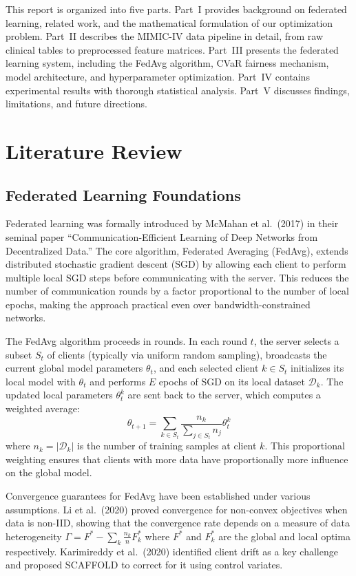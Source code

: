 \documentclass[11pt,a4paper]{report}
\begin{document}
This report is organized into five parts. Part~I provides background on federated learning, related work, and the mathematical formulation of our optimization problem. Part~II describes the MIMIC-IV data pipeline in detail, from raw clinical tables to preprocessed feature matrices. Part~III presents the federated learning system, including the FedAvg algorithm, CVaR fairness mechanism, model architecture, and hyperparameter optimization. Part~IV contains experimental results with thorough statistical analysis. Part~V discusses findings, limitations, and future directions.


\chapter{Literature Review}

\section{Federated Learning Foundations}

Federated learning was formally introduced by McMahan et al.\ (2017) in their seminal paper ``Communication-Efficient Learning of Deep Networks from Decentralized Data.'' The core algorithm, Federated Averaging (FedAvg), extends distributed stochastic gradient descent (SGD) by allowing each client to perform multiple local SGD steps before communicating with the server. This reduces the number of communication rounds by a factor proportional to the number of local epochs, making the approach practical even over bandwidth-constrained networks.

The FedAvg algorithm proceeds in rounds. In each round $t$, the server selects a subset $S_t$ of clients (typically via uniform random sampling), broadcasts the current global model parameters $\theta_t$, and each selected client $k \in S_t$ initializes its local model with $\theta_t$ and performs $E$ epochs of SGD on its local dataset $\mathcal{D}_k$. The updated local parameters $\theta_t^k$ are sent back to the server, which computes a weighted average:
\begin{equation}
\theta_{t+1} = \sum_{k \in S_t} \frac{n_k}{\sum_{j \in S_t} n_j} \theta_t^k
\label{eq:fedavg}
\end{equation}
where $n_k = |\mathcal{D}_k|$ is the number of training samples at client $k$. This proportional weighting ensures that clients with more data have proportionally more influence on the global model.

Convergence guarantees for FedAvg have been established under various assumptions. Li et al.\ (2020) proved convergence for non-convex objectives when data is non-IID, showing that the convergence rate depends on a measure of data heterogeneity $\Gamma = F^* - \sum_k \frac{n_k}{n} F_k^*$ where $F^*$ and $F_k^*$ are the global and local optima respectively. Karimireddy et al.\ (2020) identified client drift as a key challenge and proposed SCAFFOLD to correct for it using control variates.
\end{document}
